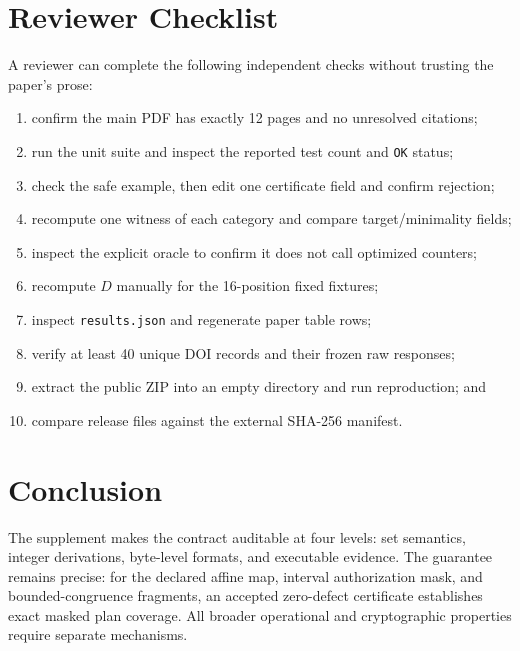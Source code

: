 \documentclass[11pt,onecolumn]{IEEEtran}
\newcommand{\code}[1]{\texttt{#1}}
\begin{document}
\section{Reviewer Checklist}
A reviewer can complete the following independent checks without trusting the paper's prose:
\begin{enumerate}
\item confirm the main PDF has exactly 12 pages and no unresolved citations;
\item run the unit suite and inspect the reported test count and \code{OK} status;
\item check the safe example, then edit one certificate field and confirm rejection;
\item recompute one witness of each category and compare target/minimality fields;
\item inspect the explicit oracle to confirm it does not call optimized counters;
\item recompute $D$ manually for the 16-position fixed fixtures;
\item inspect \code{results.json} and regenerate paper table rows;
\item verify at least 40 unique DOI records and their frozen raw responses;
\item extract the public ZIP into an empty directory and run reproduction; and
\item compare release files against the external SHA-256 manifest.
\end{enumerate}

\section{Conclusion}
The supplement makes the contract auditable at four levels: set semantics, integer derivations, byte-level formats, and executable evidence.  The guarantee remains precise: for the declared affine map, interval authorization mask, and bounded-congruence fragments, an accepted zero-defect certificate establishes exact masked plan coverage.  All broader operational and cryptographic properties require separate mechanisms.
\end{document}
